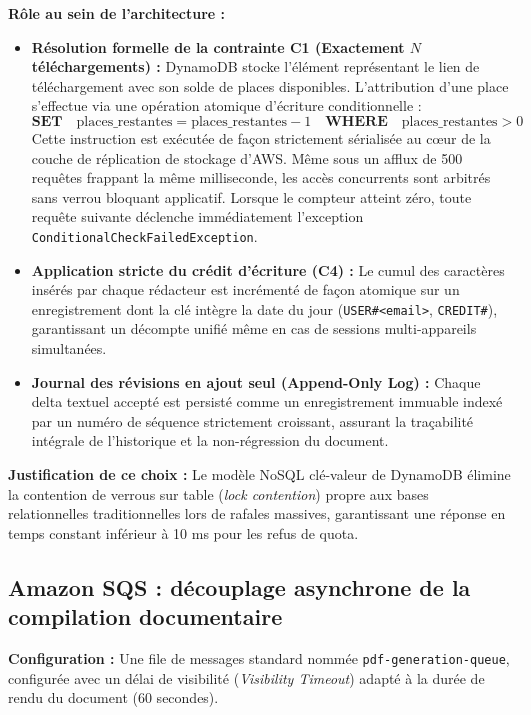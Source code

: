 \textbf{Rôle au sein de l'architecture :}
\begin{itemize}
    \item \textbf{Résolution formelle de la contrainte C1 (Exactement $N$ téléchargements) :} DynamoDB stocke l'élément représentant le lien de téléchargement avec son solde de places disponibles. L'attribution d'une place s'effectue via une opération atomique d'écriture conditionnelle :
    \begin{equation}
        \mathbf{SET} \quad \text{places\_restantes} = \text{places\_restantes} - 1 \quad \mathbf{WHERE} \quad \text{places\_restantes} > 0
    \end{equation}
    Cette instruction est exécutée de façon strictement sérialisée au cœur de la couche de réplication de stockage d'AWS. Même sous un afflux de 500 requêtes frappant la même milliseconde, les accès concurrents sont arbitrés sans verrou bloquant applicatif. Lorsque le compteur atteint zéro, toute requête suivante déclenche immédiatement l'exception \texttt{ConditionalCheckFailedException}.
    \item \textbf{Application stricte du crédit d'écriture (C4) :} Le cumul des caractères insérés par chaque rédacteur est incrémenté de façon atomique sur un enregistrement dont la clé intègre la date du jour (\texttt{USER\#<email>}, \texttt{CREDIT\#<YYYY-MM-DD>}), garantissant un décompte unifié même en cas de sessions multi-appareils simultanées.
    \item \textbf{Journal des révisions en ajout seul (Append-Only Log) :} Chaque delta textuel accepté est persisté comme un enregistrement immuable indexé par un numéro de séquence strictement croissant, assurant la traçabilité intégrale de l'historique et la non-régression du document.
\end{itemize}

\textbf{Justification de ce choix :}
Le modèle NoSQL clé-valeur de DynamoDB élimine la contention de verrous sur table (\emph{lock contention}) propre aux bases relationnelles traditionnelles lors de rafales massives, garantissant une réponse en temps constant inférieur à 10 ms pour les refus de quota.

\subsection{Amazon SQS : découplage asynchrone de la compilation documentaire}

\textbf{Configuration :} Une file de messages standard nommée \texttt{pdf-generation-queue}, configurée avec un délai de visibilité (\emph{Visibility Timeout}) adapté à la durée de rendu du document (60 secondes).

